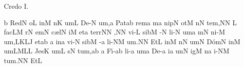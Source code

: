 
\beginhymn Credo I.

\gregorianCclef
{}
\Internote
\nosolesmescustos
\initiumgregorianum
\znotes\fissum{1pt}\bmolle b\en
{}%
\sgn R{e}d\punctum N\egn
\sgn {}o{}\punctum L\egn
\spatium
\begingroup
\bgenerale
\sgn {}in\punctum M\egn
\spatium
{}n\punctum K\egn
\sgn {}um\punctum L\egn
\spatium
\sgn D{e}-\punctum N\egn
\sgn {}u{m,}\punctum a\egn
\spatium
\divisiofinalis
\spatium
\sgn P{a}t\pes ab\egn
\sgn rem\punctum a\egn
\spatium
{}m\punctum a\egn
\sgn nip\punctum N\egn
\sgn {}ot\punctum M\egn
{}n\punctum N\egn
\sgn te{m,}\punctum N\augmentum N\egn
\spatium
\divisiominor
\spatium
\custos L
\lineaproxima
\sgn fac\pes LM\egn
{}r\punctum N\egn
\sgn {}em\punctum N\egn
\spatium
\sgn c{\ae}l\punctum N\egn
\sgn {}i{}\punctum M\egn
\spatium
\sgn {}et\punctum a\egn
\spatium
\sgn te{rr}\punctum N\augmentum N\egn
\sgn {}{\ae},\punctum N\augmentum N\egn
\spatium
\divisiominima
\spatium
\sgn vi-\punctum L\egn
\sgn sib\punctum M\egn
\sgn {}{\'\i}-\punctum N\egn
\sgn li-\punctum N\egn
\sgn {}um\punctum a\egn
\spatium
{}m\punctum N\egn
\sgn ni-\punctum M\egn
\sgn {}u{m,}\clivis LK\augmentumduplex LJ\egn
\spatium
\divisiominima
\spatium
\sgn {}et\pes ab\egn
\spatium
\custos a
\lineaproxima
\sgn {}in\punctum a\egn
\sgn vi-\punctum N\egn
\sgn sib\punctum M\egn
\sgn {}{\'\i}-\punctum a\egn
\sgn li-\clivis NM\egn
\sgn {}u{m.}\punctum N\augmentum N\egn
\spatium
\divisiofinalis
\spatium
\sgn {}Et\punctum L\egn
\spatium
\sgn {}in\punctum M\egn
\spatium
{}n\punctum N\egn
\sgn {}um\punctum N\egn
\spatium
\sgn D{\'o}m\punctum N\egn
\sgn {}in\punctum M\egn
\sgn {}um\torculus LML\punctum L\egn
\spatium
\divisiominima
\spatium
\sgn J{e}s\punctum K\egn
\sgn {}um\punctum L\egn
\spatium
{}s\punctum N\egn
\sgn tu{m,}\punctum a\augmentum b\egn
\spatium
\divisiominor
\spatium
\custos a
\lineaproxima
\sgn F{\'\i}-\pes ab\egn
\sgn li-\punctum a\egn
\sgn {}um\punctum a\egn
\spatium
\sgn D{e}-\punctum a\egn
\sgn {}i{}\punctum a\egn
\spatium
\sgn {}un\punctum N\egn
\sgn {}ig\punctum M\egn
{}n\punctum a\egn
\sgn {}i-\clivis NM\egn
\sgn tu{m.}\punctum N\augmentum N\egn
\spatium
\divisiofinalis
\spatium
\sgn {}Et\punctum L\egn
\spatium
